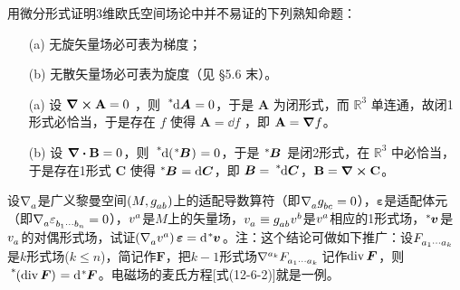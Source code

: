 \begin{xiti}
	\item 用微分形式证明3维欧氏空间场论中并不易证的下列熟知命题：
	\begin{enumerate}
		\item[(a)] 无旋矢量场必可表为梯度；
		\item[(b)] 无散矢量场必可表为旋度（见 \S 5.6 末）。
	\end{enumerate}

    \begin{zm}
    	\begin{enumerate}
    		\item[(a)] 设 $\curl{\vb{A}}=0$ ，则 $\tensor[^*]{\dd{\bm{A}}}{}=0 $，于是 $\bm{A}$ 为闭形式，而 $\mathbb{R}^3$ 单连通，故闭1形式必恰当，于是存在 $f$ 使得 $\bm{A} = \dd{f}$ ，即 $\vb{A}= \grad{f}$。
    		\item[(b)] 设 $\div{\vb{B}}=0$，则 $\tensor[^*]{\dd(\tensor[^*]{\bm{B}}{})}{}=0$，于是 $\tensor[^*]{\bm{B}}{}$ 是闭2形式，在 $\mathbb{R}^3$ 中必恰当，于是存在1形式 $\bm{C}$ 使得 $\tensor[^*]{\bm{B}}{} = \dd{\bm{C}}$，即 $\bm{B} = \tensor[^*]{\dd{\bm{C}}}{}$，$\vb{B}=\curl{\vb{C}}$。
    	\end{enumerate}
    \end{zm}
    
    \item 设$\Nabla{a} $是广义黎曼空间$\left(M,\tensor{g}{_a_b} \right) $上的适配导数算符（即$\Nabla{a} \tensor{g}{_b_c}=0 $），$\bm{\varepsilon} $是适配体元（即$\Nabla{a} \tensor{\varepsilon}{_{b_1 \cdots b_n}}=0 $），$\tensor{v}{^a} $是$M$上的矢量场，$\tensor{v}{_a} \equiv \tensor{g}{_a_b} \tensor{v}{^b} $是$\tensor{v}{^a} $相应的1形式场，$\tensor[^*]{\bm{v}}{} $是$\tensor{v}{_a} $的对偶形式场，试证$\left( \Nabla{a} \tensor{v}{^a} \right) \bm{\varepsilon} = \dd{\tensor[^*]{\bm{v}}{}} $。注：这个结论可做如下推广：设$\tensor{F}{_{a_1 \cdots a_k}} $是$k$形式场($k\leqslant n $)，简记作$\bm{F} $，把$k-1$形式场$\tensor{\nabla}{^{a_k}} \tensor{F}{_{a_1 \cdots a_k}} $记作$\operatorname{div} \bm{F} $，则$\tensor[^*]{\left(\ddiv\bm{F} \right)}{} = \dd{\tensor[^*]{\bm{F}}{}} $。电磁场的麦氏方程[式(12-6-2)]就是一例。
    

\end{xiti}
